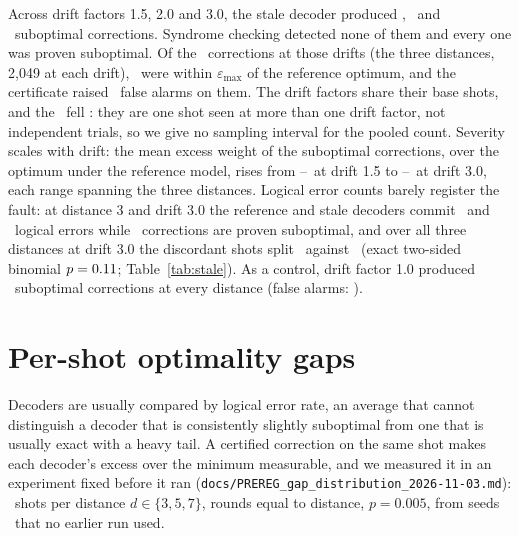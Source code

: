 \documentclass[aps,pra,twocolumn,superscriptaddress,nofootinbib,longbibliography,floatfix]{revtex4-2}
\newcommand{\eps}{\varepsilon}
\begin{document}
Across drift factors 1.5, 2.0 and 3.0, the stale decoder produced \DetStaleSuboptimalOneFive, \DetStaleSuboptimalTwo\ and \DetStaleSuboptimalThree\ suboptimal corrections. Syndrome checking detected none of them and every one was proven suboptimal. Of the \DetStaleCorrections\ corrections at those drifts (the three distances, 2{,}049 at each drift), \DetStaleAcceptable\ were within $\eps_{\max}$ of the reference optimum, and the certificate raised \DetStaleFalseAlarms\ false alarms on them. The drift factors share their base shots, and the \DetStaleFalseAlarms\ fell \DetStaleFalseAlarmWhere: they are one shot seen at more than one drift factor, not independent trials, so we give no sampling interval for the pooled count. Severity scales with drift: the mean excess weight of the suboptimal corrections, over the optimum under the reference model, rises from \DetStaleExcessLoOneFive--\DetStaleExcessHiOneFive\ at drift 1.5 to \DetStaleExcessLoThree--\DetStaleExcessHiThree\ at drift 3.0, each range spanning the three distances. Logical error counts barely register the fault: at distance 3 and drift 3.0 the reference and stale decoders commit \DetStaleDThreeTrueErrors\ and \DetStaleDThreeStaleErrors\ logical errors while \DetStaleDThreeProven\ corrections are proven suboptimal, and over all three distances at drift 3.0 the discordant shots split \DetStaleDiscStaleOnly\ against \DetStaleDiscTrueOnly\ (exact two-sided binomial $p=0.11$; Table~\ref{tab:stale}). As a control, drift factor 1.0 produced \DetStaleControlSuboptimal\ suboptimal corrections at every distance (false alarms: \DetStaleControlFalseAlarms).

\section{Per-shot optimality gaps}
\label{sec:gaps}

Decoders are usually compared by logical error rate, an average that cannot distinguish a decoder that is consistently slightly suboptimal from one that is usually exact with a heavy tail. A certified correction on the same shot makes each decoder's excess over the minimum measurable, and we measured it in an experiment fixed before it ran (\nolinkurl{docs/PREREG_gap_distribution_2026-11-03.md}): \GapShotsPerDistance\ shots per distance $d\in\{3,5,7\}$, rounds equal to distance, $p=0.005$, from seeds \GapSeeds\ that no earlier run used.
\end{document}
